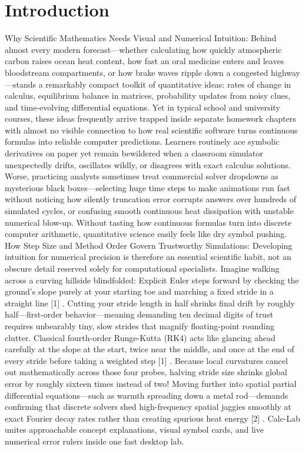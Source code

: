 \documentclass[10pt,letterpaper]{article}
\begin{document}
\section{Introduction}
Why Scientific Mathematics Needs Visual and Numerical Intuition: Behind almost every modern forecast---whether calculating how quickly atmospheric carbon raises ocean heat content, how fast an oral medicine enters and leaves bloodstream compartments, or how brake waves ripple down a congested highway---stands a remarkably compact toolkit of quantitative ideas: rates of change in calculus, equilibrium balance in matrices, probability updates from noisy clues, and time-evolving differential equations. Yet in typical school and university courses, these ideas frequently arrive trapped inside separate homework chapters with almost no visible connection to how real scientific software turns continuous formulas into reliable computer predictions. Learners routinely ace symbolic derivatives on paper yet remain bewildered when a classroom simulator unexpectedly drifts, oscillates wildly, or disagrees with exact calculus solutions. Worse, practicing analysts sometimes treat commercial solver dropdowns as mysterious black boxes---selecting huge time steps to make animations run fast without noticing how silently truncation error corrupts answers over hundreds of simulated cycles, or confusing smooth continuous heat dissipation with unstable numerical blow-up. Without tasting how continuous formulas turn into discrete computer arithmetic, quantitative science easily feels like dry symbol pushing. How Step Size and Method Order Govern Trustworthy Simulations: Developing intuition for numerical precision is therefore an essential scientific habit, not an obscure detail reserved solely for computational specialists. Imagine walking across a curving hillside blindfolded: Explicit Euler steps forward by checking the ground's slope purely at your starting toe and marching a fixed stride in a straight line [1] . Cutting your stride length in half shrinks final drift by roughly half---first-order behavior---meaning demanding ten decimal digits of trust requires unbearably tiny, slow strides that magnify floating-point rounding clutter. Classical fourth-order Runge-Kutta (RK4) acts like glancing ahead carefully at the slope at the start, twice near the middle, and once at the end of every stride before taking a weighted step [1] . Because local curvatures cancel out mathematically across those four probes, halving stride size shrinks global error by roughly sixteen times instead of two! Moving further into spatial partial differential equations---such as warmth spreading down a metal rod---demands confirming that discrete solvers shed high-frequency spatial jaggies smoothly at exact Fourier decay rates rather than creating spurious heat energy [2] . Calc-Lab unites approachable concept explanations, visual symbol cards, and live numerical error rulers inside one fast desktop lab.
\end{document}
